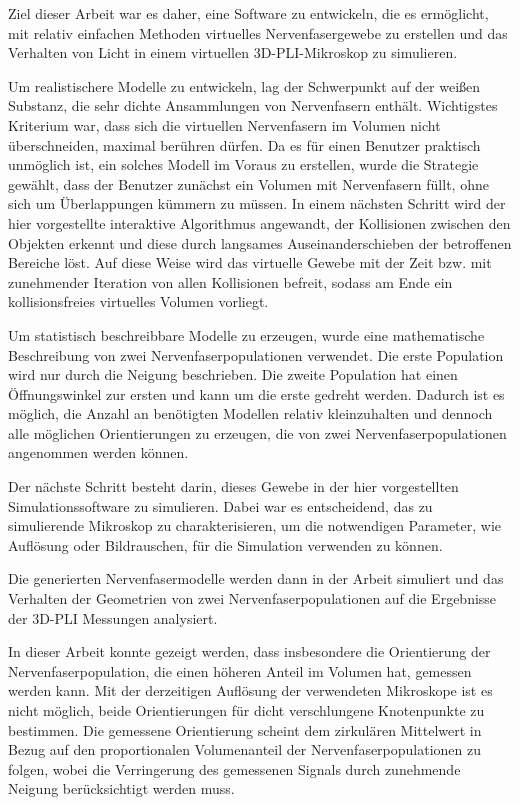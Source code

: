 Ziel dieser Arbeit war es daher, eine Software zu entwickeln, die es ermöglicht, mit relativ einfachen Methoden virtuelles Nervenfasergewebe zu erstellen und das Verhalten von Licht in einem virtuellen 3D-PLI-Mikroskop zu simulieren.

Um realistischere Modelle zu entwickeln, lag der Schwerpunkt auf der weißen Substanz, die sehr dichte Ansammlungen von Nervenfasern enthält.
Wichtigstes Kriterium war, dass sich die virtuellen Nervenfasern im Volumen nicht überschneiden, maximal berühren dürfen.
Da es für einen Benutzer praktisch unmöglich ist, ein solches Modell im Voraus zu erstellen, wurde die Strategie gewählt, dass der Benutzer zunächst ein Volumen mit Nervenfasern füllt, ohne sich um Überlappungen kümmern zu müssen.
In einem nächsten Schritt wird der hier vorgestellte interaktive Algorithmus angewandt, der Kollisionen zwischen den Objekten erkennt und diese durch langsames Auseinanderschieben der betroffenen Bereiche löst.
Auf diese Weise wird das virtuelle Gewebe mit der Zeit bzw. mit zunehmender Iteration von allen Kollisionen befreit, sodass am Ende ein kollisionsfreies virtuelles Volumen vorliegt.

Um statistisch beschreibbare Modelle zu erzeugen, wurde eine mathematische Beschreibung von zwei Nervenfaserpopulationen verwendet.
Die erste Population wird nur durch die Neigung beschrieben.
Die zweite Population hat einen Öffnungswinkel zur ersten und kann um die erste gedreht werden.
Dadurch ist es möglich, die Anzahl an benötigten Modellen relativ kleinzuhalten und dennoch alle möglichen Orientierungen zu erzeugen, die von zwei Nervenfaserpopulationen angenommen werden können.

Der nächste Schritt besteht darin, dieses Gewebe in der hier vorgestellten Simulationssoftware zu simulieren.
Dabei war es entscheidend, das zu simulierende Mikroskop zu charakterisieren, um die notwendigen Parameter, wie Auflösung oder Bildrauschen, für die Simulation verwenden zu können.

Die generierten Nervenfasermodelle werden dann in der Arbeit simuliert und das Verhalten der Geometrien von zwei Nervenfaserpopulationen auf die Ergebnisse der 3D-PLI Messungen analysiert.

In dieser Arbeit konnte gezeigt werden, dass insbesondere die Orientierung der Nervenfaserpopulation, die einen höheren Anteil im Volumen hat, gemessen werden kann.
Mit der derzeitigen Auflösung der verwendeten Mikroskope ist es nicht möglich, beide Orientierungen für dicht verschlungene Knotenpunkte zu bestimmen.
Die gemessene Orientierung scheint dem zirkulären Mittelwert in Bezug auf den proportionalen Volumenanteil der Nervenfaserpopulationen zu folgen, wobei die Verringerung des gemessenen Signals durch zunehmende Neigung berücksichtigt werden muss.

